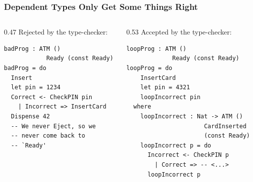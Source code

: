 \documentclass[compress]{beamer}
\begin{document}
\begin{frame}[fragile]
  \frametitle{Dependent Types Only Get Some Things Right}

  \begin{columns}
  \begin{column}{0.47\framewidth}
    {\color{red} Rejected by the type-checker:}
    \vspace*{1mm}
    \begin{verbatim}
badProg : ATM ()
            Ready (const Ready)
badProg = do
  Insert
  let pin = 1234
  Correct <- CheckPIN pin
    | Incorrect => InsertCard
  Dispense 42
  -- We never Eject, so we
  -- never come back to
  -- `Ready'
    \end{verbatim}
    \vspace*{2.5mm}
  \end{column}

  \pause  %

  \vrule{}

  \begin{column}{0.53\framewidth}
    {\color{orange} Accepted by the type-checker:}
    \vspace*{1mm}
    \begin{verbatim}
loopProg : ATM ()
             Ready (const Ready)
loopProg = do
    InsertCard
    let pin = 4321
    loopIncorrect pin
  where
    loopIncorrect : Nat -> ATM ()
                      CardInserted
                      (const Ready)
    loopIncorrect p = do
      Incorrect <- CheckPIN p
        | Correct => -- <...>
      loopIncorrect p
    \end{verbatim}
    \vspace*{-6mm}
  \end{column}
  \end{columns}
\end{frame}
\end{document}
